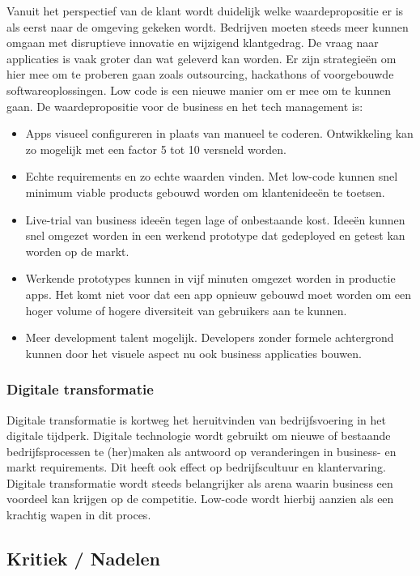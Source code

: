Vanuit het perspectief van de klant wordt duidelijk welke waardepropositie er is als eerst naar de omgeving gekeken wordt. Bedrijven moeten steeds meer kunnen omgaan met disruptieve innovatie en wijzigend klantgedrag. De vraag naar applicaties is vaak groter dan wat geleverd kan worden. Er zijn strategieën om hier mee om te proberen gaan zoals outsourcing, hackathons of voorgebouwde softwareoplossingen. Low code is een nieuwe manier om er mee om te kunnen gaan. De waardepropositie voor de business en het tech management is:
\begin{itemize}
    \item Apps visueel configureren in plaats van manueel te coderen. Ontwikkeling kan zo mogelijk met een factor 5 tot 10 versneld worden.
    \item Echte requirements en zo echte waarden vinden. Met low-code kunnen snel minimum viable products gebouwd worden om klantenideeën te toetsen.
    \item Live-trial van business ideeën tegen lage of onbestaande kost. Ideeën kunnen snel omgezet worden in een werkend prototype dat gedeployed en getest kan worden op de markt.
    \item Werkende prototypes kunnen in vijf minuten omgezet worden in productie apps. Het komt niet voor dat een app opnieuw gebouwd moet worden om een hoger volume of hogere diversiteit van gebruikers aan te kunnen.
    \item Meer development talent mogelijk. Developers zonder formele achtergrond kunnen door het visuele aspect nu ook business applicaties bouwen.
\end{itemize} \autocite{Richardson2016}

\subsubsection{Digitale transformatie}

Digitale transformatie is kortweg het heruitvinden van bedrijfsvoering in het digitale tijdperk. Digitale technologie wordt gebruikt om nieuwe of bestaande bedrijfsprocessen te (her)maken als antwoord op veranderingen in business- en markt requirements. Dit heeft ook effect op bedrijfscultuur en klantervaring. \autocite{Salesforce}\\
Digitale transformatie wordt steeds belangrijker als arena waarin business een voordeel kan krijgen op de competitie. Low-code wordt hierbij aanzien als een krachtig wapen in dit proces.

\subsection{Kritiek / Nadelen}

